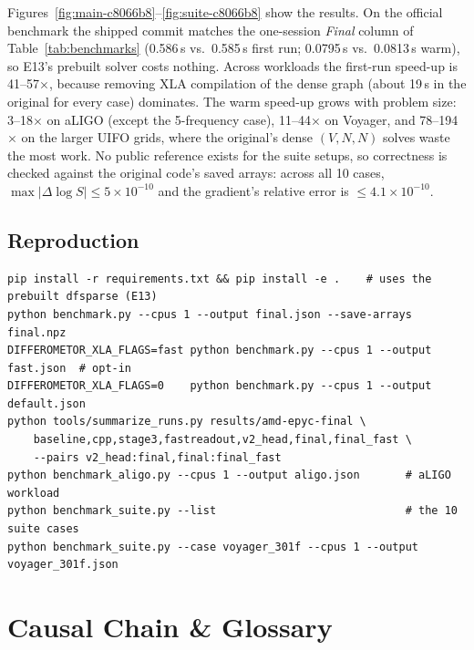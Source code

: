 \documentclass[11pt,a4paper]{article}
\begin{document}
Figures~\ref{fig:main-c8066b8}--\ref{fig:suite-c8066b8} show the results. On the official benchmark the shipped commit matches the one-session \emph{Final} column of Table~\ref{tab:benchmarks} (0.586\,s vs.\ 0.585\,s first run; 0.0795\,s vs.\ 0.0813\,s warm), so E13's prebuilt solver costs nothing. Across workloads the first-run speed-up is 41--57$\times$, because removing XLA compilation of the dense graph (about 19\,s in the original for every case) dominates. The warm speed-up grows with problem size: 3--18$\times$ on aLIGO (except the 5-frequency case), 11--44$\times$ on Voyager, and 78--194$\times$ on the larger UIFO grids, where the original's dense $(V, N, N)$ solves waste the most work. No public reference exists for the suite setups, so correctness is checked against the original code's saved arrays: across all 10 cases, $\max|\Delta \log S| \le 5\times 10^{-10}$ and the gradient's relative error is $\le 4.1\times 10^{-10}$.

\subsection{Reproduction}

\begin{footnotesize}
\begin{verbatim}
pip install -r requirements.txt && pip install -e .    # uses the prebuilt dfsparse (E13)
python benchmark.py --cpus 1 --output final.json --save-arrays final.npz
DIFFEROMETOR_XLA_FLAGS=fast python benchmark.py --cpus 1 --output fast.json  # opt-in
DIFFEROMETOR_XLA_FLAGS=0    python benchmark.py --cpus 1 --output default.json
python tools/summarize_runs.py results/amd-epyc-final \
    baseline,cpp,stage3,fastreadout,v2_head,final,final_fast \
    --pairs v2_head:final,final:final_fast
python benchmark_aligo.py --cpus 1 --output aligo.json       # aLIGO workload
python benchmark_suite.py --list                             # the 10 suite cases
python benchmark_suite.py --case voyager_301f --cpus 1 --output voyager_301f.json
\end{verbatim}
\end{footnotesize}

\section{Causal Chain \& Glossary}
\end{document}
